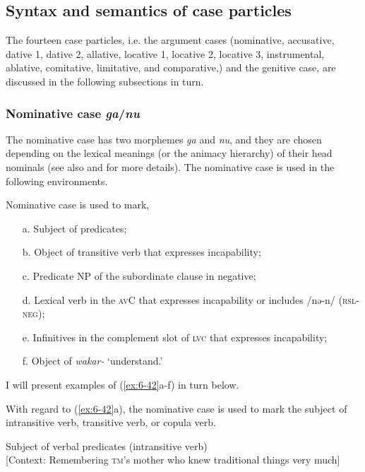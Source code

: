 \subsection{Syntax and semantics of case particles}

The fourteen case particles, i.e. the argument cases (nominative, accusative, dative 1, dative 2, allative, locative 1, locative 2, locative 3, instrumental, ablative, comitative, limitative, and comparative,) and the genitive case, are discussed in the following subsections in turn.

\subsubsection{Nominative case \textit{ga}/\textit{nu}}
\label{bkm:Ref366360662}
The nominative case has two morphemes \textit{ga} and \textit{nu}, and they are chosen depending on the lexical meanings (or the animacy hierarchy) of their head nominals (see also  and  for more details). The nominative case is used in the following environments.

\ea\label{ex:6-42}
 Nominative case is used to mark,\\

 \begin{itemize}
\item[a.]   Subject of predicates;
\item[b.] Object of transitive verb that expresses incapability;
\item[c.] Predicate NP of the subordinate clause in negative;
\item[d.] Lexical verb in the \textsc{av}C that expresses incapability or includes /nə-n/ (\textsc{rsl}-\textsc{neg});
\item[e.] Infinitives in the complement slot of \textsc{lvc} that expresses incapability;
\item[f.] Object of \textit{wakar-} ‘understand.’
\end{itemize}
\z

I will present examples of (\ref{ex:6-42}a-f) in turn below.

With regard to (\ref{ex:6-42}a), the nominative case is used to mark the subject of intransitive verb, transitive verb, or copula verb.

\ea\label{ex:6-43}
\ea Subject of verbal predicates (intransitive verb)\\{}
[Context: Remembering \textsc{tm}’s mother who knew traditional things very much]

